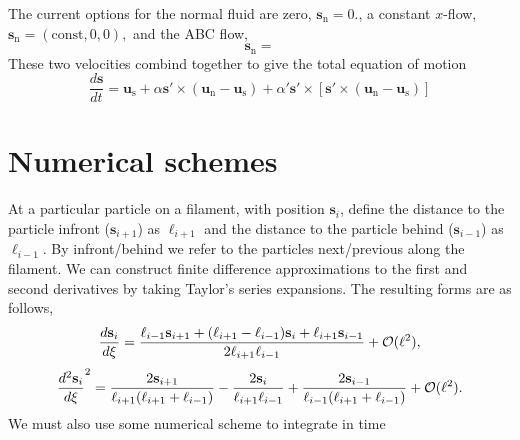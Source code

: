 \documentclass[12pt]{article}
\newcommand{\bs}{\mathbf{s}}
\newcommand{\bu}{\mathbf{u}}
\begin{document}
  The current options for the normal fluid are zero, $\bs_\mathrm{n}=0.$, a constant $x$-flow, 
  $\bs_\mathrm{n}=(\mathrm{const},0,0),$ and the ABC flow,
  \begin{equation} 
    \bs_\mathrm{n}=
  \end{equation} 
  These two velocities combind together to give the total equation of motion
  \begin{equation}
    \frac{d \bs}{dt}=\bu_\mathrm{s}+\alpha \bs' \times (\bu_\mathrm{n}-\bu_\mathrm{s})
    +\alpha' \bs' \times \left[ \bs' \times (\bu_\mathrm{n}-\bu_\mathrm{s})\right]
  \end{equation}  
\section{Numerical schemes}\label{Sec:num}
  At a particular particle on a filament, with position $\bs_i$, define the distance to the particle infront ($\bs_{i+1}$)
  as $\ell_{i+1}$ and the distance to the particle behind ($\bs_{i-1}$) as $\ell_{i-1}$.
  By infront/behind we refer to the particles next/previous along the filament.
  We can construct finite difference approximations to the first and second derivatives by taking Taylor's series expansions.
  The resulting forms are as follows,
  \begin{equation}
    \frac{d \bs_i}{d \xi}=\frac{\ell_{i-1}\bs_{i+1}+(\ell_{i+1}-\ell_{i-1})\bs_i+\ell_{i+1}\bs_{i-1}}
    {2\ell_{i+1}\ell_{i-1}}+{\cal O}(\ell^2),
  \end{equation}
  \begin{equation}
    \frac{d^2 \bs_i}{d \xi}^2=\frac{2\bs_{i+1}}{\ell_{i+1}(\ell_{i+1}+\ell_{i-1})}-\frac{2\bs_i}{\ell_{i+1}\ell_{i-1}}+\frac{2\bs_{i-1}}{\ell_{i-1}(\ell_{i+1}+\ell_{i-1})}+{\cal O}(\ell^2).
  \end{equation}
  We must also use some numerical scheme to integrate in time
\end{document}

